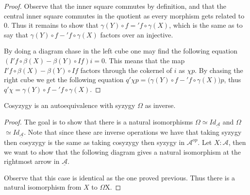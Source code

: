 \begin{proof}
        Observe that the inner square commutes by definition, and that the central inner square commutes in the quotient as every morphism gets related to $0$. Thus it remains to show that \underline{$\gamma (Y)\circ$$f$}$=$\underline{$'f\circ\gamma (X)$}, which is the same as to say that $\gamma (Y)\circ$$f-$$'f\circ\gamma (X)$ factors over an injective.

        By doing a diagram chase in the left cube one may find the following equation $(I'f\circ \beta(X)-\beta (Y)\circ If)i=0$. This means that the map $I'f\circ \beta(X)-\beta (Y)\circ If$ factors through the cokernel of $i$ as $\chi p$. By chasing the right cube we get the following equation $q'\chi p = (\gamma (Y)\circ$$f-$$'f\circ\gamma (X))p$, thus $q'\chi =$$\gamma (Y)\circ$$f-$$'f\circ\gamma (X)$.
    \end{proof}

    \begin{corollary}
        Cosyzygy \upside{$\Omega$} is an autoequivalence with syzygy $\Omega$ as inverse.
    \end{corollary}

    \begin{proof}
        The goal is to show that there is a natural isomorphisms \underline{$\Omega$\upside{$\Omega$}}$\simeq Id_{\underline{\mathcal{A}}}$ and \underline{\upside{$\Omega$}$\Omega$}$\simeq Id_{\underline{\mathcal{A}}}$. Note that since these are inverse operations we have that taking syzygy then cosyzygy is the same as taking cosyzygy then syzygy in $\mathcal{A}^{op}$.
        Let $X:\mathcal{A}$, then we want to show that the following diagram gives a natural isomorphism at the rightmost arrow in $\underline{\mathcal{A}}$.
        \begin{center}
        \end{center}
        Observe that this case is identical as the one proved previous. Thus there is a natural isomorphism from $X$ to \upside{$\Omega$}$\Omega$X.
    \end{proof}

